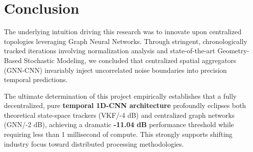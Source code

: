\documentclass[conference]{IEEEtran}
\begin{document}
\section{Conclusion}
The underlying intuition driving this research was to innovate upon centralized topologies leveraging Graph Neural Networks. Through stringent, chronologically tracked iterations involving normalization analysis and state-of-the-art Geometry-Based Stochastic Modeling, we concluded that centralized spatial aggregators (GNN-CNN) invariably inject uncorrelated noise boundaries into precision temporal predictions.

The ultimate determination of this project empirically establishes that a fully decentralized, pure \textbf{temporal 1D-CNN architecture} profoundly eclipses both theoretical state-space trackers (VKF/-4 dB) and centralized graph networks (GNN/-2 dB), achieving a dramatic \textbf{-11.04 dB} performance threshold while requiring less than 1 millisecond of compute. This strongly supports shifting industry focus toward distributed processing methodologies.
\end{document}

